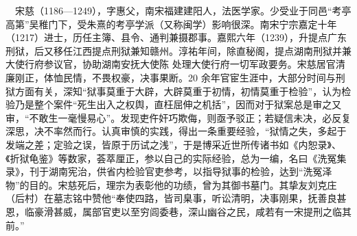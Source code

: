 \documentclass[12pt,UTF8]{ctexbook}
\begin{document}
　宋慈（1186—1249），字惠父，南宋福建建阳人，法医学家。少受业于同邑“考亭高第”吴稚门下，受朱熹的考亭学派（又称闽学）影响很深。南宋宁宗嘉定十年（1217）进士，历任主簿、县令、通判兼摄郡事。嘉熙六年（1239），升提点广东刑狱，后又移任江西提点刑狱兼知赣州。淳祐年间，除直秘阁，提点湖南刑狱并兼大使行府参议官，协助湖南安抚大使陈 处理大使行府一切军政要务。宋慈居官清廉刚正，体恤民情，不畏权豪，决事果断。20 余年官宦生涯中，大部分时间与刑狱方面有关，深知“狱事莫重于大辟，大辟莫重于初情，初情莫重于检验”，认为检验乃是整个案件“死生出入之权舆，直枉屈伸之机括”，因而对于狱案总是审之又审，“不敢生一毫慢易心”。发现吏仵奸巧欺侮，则亟予驳正；若疑信未决，必反复深思，决不率然而行。认真审慎的实践，得出一条重要经验，“狱情之失，多起于发端之差；定验之误，皆原于历试之浅”，于是博采近世所传诸书如《内恕录》、《折狱龟鉴》等数家，荟萃厘正，参以自己的实际经验，总为一编，名曰《洗冤集录》，刊于湖南宪治，供省内检验官吏参考，以指导狱事的检验，达到“洗冤泽物”的目的。宋慈死后，理宗为表彰他的功绩，曾为其御书墓门。其挚友刘克庄（后村）在墓志铭中赞他“奉使四路，皆司臬事，听讼清明，决事刚果，抚善良甚恩，临豪滑甚威，属部官吏以至穷闾委巷，深山幽谷之民，咸若有一宋提刑之临其前。”
\end{document}
